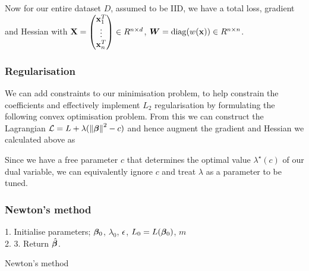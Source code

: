 \begin{appendices}
Now for our entire dataset $D$, assumed to be IID, we have a total loss, gradient and Hessian
with $\mathbf{X} = \begin{pmatrix} \mathbf{x}_1^T \\ \vdots \\ \mathbf{x}_n^T \end{pmatrix} \in R^{n\times d}$, $\bm{W} = \operatorname{diag}(w(\mathbf{x})) \in R^{n\times n}$.

\subsubsection{Regularisation}
We can add constraints to our minimisation problem, to help constrain the coefficients and effectively implement $L_2$ regularisation by formulating the following convex optimisation problem.
From this we can construct the Lagrangian $\mathcal{L} = L + \lambda(\left\lVert\bm{\beta}\right\rVert^2 - c)$ and hence augment the gradient and Hessian we calculated above as

Since we have a free parameter $c$ that determines the optimal value $\lambda^\star(c)$ of our dual variable, we can equivalently ignore $c$ and treat $\lambda$ as a parameter to be tuned.

\subsubsection{Newton's method}

\begin{algorithm}[H]
    1. Initialise parameters; $\bm{\beta}_0$, $\lambda_0$, $\epsilon$, $L_0 = L(\bm{\beta}_0)$, $m$\\
    2.  
    3. Return $\hat{\bm{\beta}}$.
    \caption{Newton's method}
\end{algorithm}

\end{appendices}